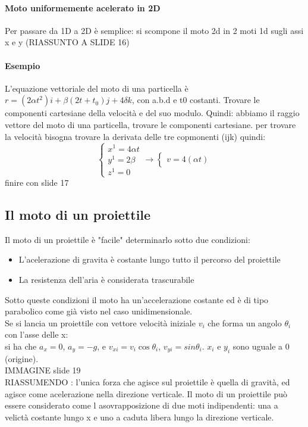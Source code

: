 \documentclass[12pt, a4paper, openany]{book}
\begin{document}
\paragraph*{Moto uniformemente acelerato in 2D} %
Per passare da 1D a 2D è semplice: si scompone il moto 2d in 2 moti 1d sugli assi x e y
(RIASSUNTO A SLIDE 16)

\paragraph*{Esempio} L'equazione vettoriale del moto di una particella è $r = (2\alpha t^2)i +\beta(2t + t_0)j + 4\delta k$, con a.b.d e t0 costanti. Trovare le componenti cartesiane della velocità e del suo modulo.
Quindi: abbiamo il raggio vettore del moto di una particella, trovare le componenti cartesiane.
per trovare la velocità bisogna trovare la derivata delle tre copmonenti (ijk) quindi:
$$ \begin{cases}
    x^1 = 4\alpha t \\ y^1 = 2\beta \\ z^1 = 0 
\end{cases}
\to 
\begin{cases}
   v= 4(\alpha t )
\end{cases}
$$ finire con slide 17

\subsection*{Il moto di un proiettile}
Il moto di un proiettile è "facile" determinarlo sotto due condizioni:
\begin{itemize}
    \item L'acelerazione di gravita è costante lungo tutto il percorso del proiettile
    \item La resistenza dell'aria è considerata trascurabile
\end{itemize}
Sotto queste condizioni il moto ha un'accelerazione costante ed è di tipo parabolico come già visto nel caso unidimensionale.
\\Se si lancia un proiettile con vettore velocità iniziale $v_i$ che forma un angolo $\theta_i$ con l'asse delle x:
\\si ha che $a_x = 0$, $a_y = -g$, e $v_{xi} = v_i \cos \theta_i$, $v_{yi} = sin \theta_i$. $x_i$ e $y_i$ sono uguale a 0 (origine).
\\IMMAGINE slide 19 
\\RIASSUMENDO : l'unica forza che agisce sul proiettile è quella di gravità, ed agisce come acelerazione nella direzione verticale.
Il moto di un proiettile può essere considerato come l asovrapposizione di due moti indipendenti: una a velictà costante lungo x e uno a caduta libera lungo la direzione verticale.
\end{document}
